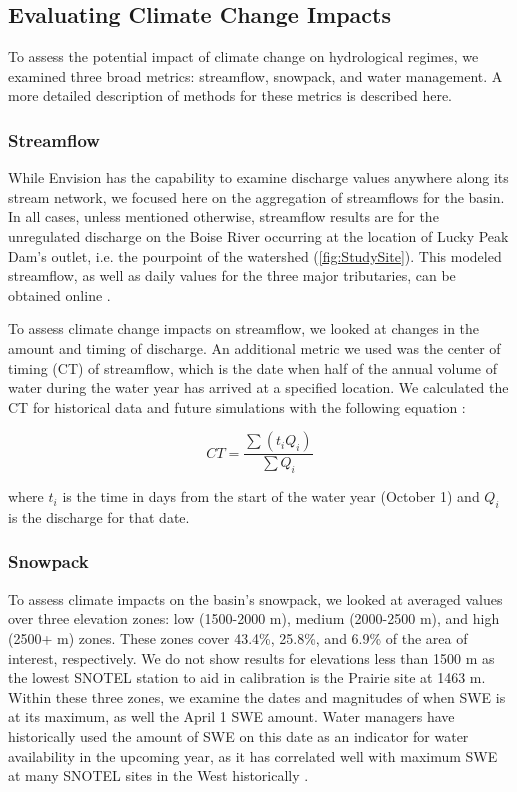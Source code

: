 \documentclass[11pt,letterpaper]{article}
\begin{document}
\subsection{Evaluating Climate Change Impacts}

To assess the potential impact of climate change on hydrological regimes, we examined three broad metrics: streamflow, snowpack, and water management. A more detailed description of methods for these metrics is described here.

\subsubsection{Streamflow}
While Envision has the capability to examine discharge values anywhere along its stream network, we focused here on the aggregation of streamflows for the basin. In all cases, unless mentioned otherwise, streamflow results are for the unregulated discharge on the Boise River occurring at the location of Lucky Peak Dam's outlet, i.e. the pourpoint of the watershed (\cref{fig:StudySite}). This modeled streamflow, as well as daily values for the three major tributaries, can be obtained online \citep{Steimke:2017hb}. 

To assess climate change impacts on streamflow, we looked at changes in the amount and timing of discharge. An additional metric we used was the center of timing (CT) of streamflow, which is the date when half of the annual volume of water during the water year has arrived at a specified location. We calculated the CT for historical data and future simulations with the following equation \citep{Stewart:2005ed}: 

\begin{equation}
CT = \frac{\sum \left(t_iQ_i\right)}{\sum Q_i}
\end{equation}

where $t_i$ is the time in days from the start of the water year (October 1) and $Q_i$ is the discharge for that date. 

\subsubsection{Snowpack}

To assess climate impacts on the basin’s snowpack, we looked at averaged values over three elevation zones: low (1500-2000 m), medium (2000-2500 m), and high (2500+ m) zones. These zones cover 43.4\%, 25.8\%, and 6.9\% of the area of interest, respectively. We do not show results for elevations less than 1500 m as the lowest SNOTEL station to aid in calibration is the Prairie site at 1463 m. Within these three zones, we examine the dates and magnitudes of when SWE is at its maximum, as well the April 1 SWE amount. Water managers have historically used the amount of SWE on this date as an indicator for water availability in the upcoming year, as it has correlated well with maximum SWE at many SNOTEL sites in the West historically \citep{Bohr:2001bc}.
\end{document}
